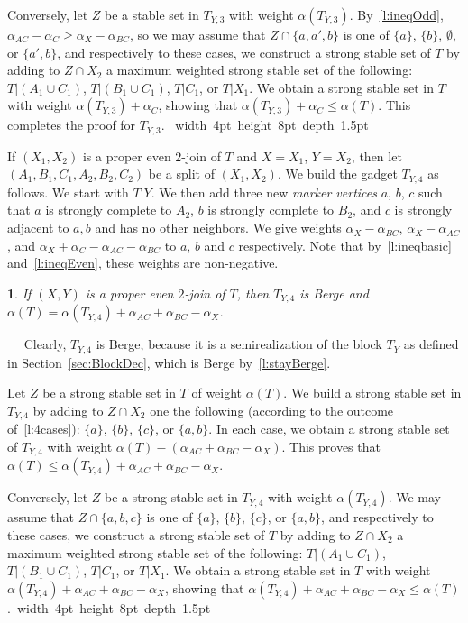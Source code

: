 \documentclass[11 pt] {article}
\newcommand\blackslug{\hbox{\hskip 1pt \vrule width 4pt height 8pt depth 1.5pt
        \hskip 1pt}}
\newcommand\bbox{\hfill \quad \blackslug \medbreak}
\newtheorem{lemma}[theorem]{}
\newcounter{claim}
\newcommand{\Proof}{\setcounter{claim}{0}\noindent{\bf Proof.}\ \ }
\begin{document}
Conversely, let $Z$ be a stable set in $T_{Y, 3}$ with weight
$\alpha(T_{Y, 3})$.  By~\ref{l:ineqOdd}, $\alpha_{AC} - \alpha_C \geq
\alpha_X - \alpha_{BC}$, so we may assume that $Z \cap \{a, a', b\}$
is one of $\{a\}$, $\{b\}$, $\emptyset$, or $\{a', b\}$, and
respectively to these cases, we construct a strong stable set of $T$
by adding to $Z\cap X_2$ a maximum weighted strong stable set of the
following: $T|(A_1 \cup C_1)$, $T|(B_1 \cup C_1)$, $T|C_1$, or
$T|X_1$.  We obtain a strong stable set in $T$ with weight
$\alpha(T_{Y, 3}) + \alpha_C$, showing that $\alpha(T_{Y, 3}) +
\alpha_C \leq \alpha(T)$. This completes the proof for $T_{Y, 3}$.
\bbox


If $(X_1,X_2)$ is a proper even $2$-join of $T$ and $X=X_1$, $Y=X_2$,
then let $(A_1,B_1,C_1,A_2,B_2,C_2)$ be a split of $(X_1, X_2)$. We
build the gadget $T_{Y, 4}$ as follows.  We start with
$T |Y$.  We then add three new \emph{marker vertices} $a$, $b$, $c$
such that $a$ is strongly complete to $A_2$, $b$ is strongly complete
to $B_2$, and $c$ is strongly adjacent to $a, b$ and has no other
neighbors.  We give weights $\alpha_X - \alpha_{BC}$, $\alpha_X -
\alpha_{AC}$, and $\alpha_{X} + \alpha_{C} - \alpha_{AC} -
\alpha_{BC}$ to $a$, $b$ and $c$ respectively.  Note that
by~\ref{l:ineqbasic} and~\ref{l:ineqEven}, these weights are non-negative.

\begin{lemma}
  \label{l:evenblock4}
  If $(X, Y)$ is a proper even $2$-join of $T$, then $T_{Y, 4}$ is
  Berge and $\alpha(T) = \alpha(T_{Y, 4}) + \alpha_{AC} + \alpha_{BC}
  - \alpha_{X}$.
\end{lemma}
\Proof 
Clearly, $T_{Y, 4}$ is Berge, because it is a semirealization of the
block $T_Y$ as defined in Section~\ref{sec:BlockDec}, which is Berge
by~\ref{l:stayBerge}.  

Let $Z$ be a strong stable set in $T$ of weight $\alpha(T)$.
We build a strong stable set in $T_{Y, 4}$ by adding to $Z \cap X_2$
one the following (according to the outcome of~\ref{l:4cases}):
$\{a\}$, $\{b\}$, $\{c\}$, or $\{a, b\}$.  In each case, we obtain a
strong stable set of $T_{Y, 4}$ with weight $\alpha(T) - (\alpha_{AC}
+ \alpha_{BC} - \alpha_{X})$.  This proves that $\alpha(T) \leq
\alpha(T_{Y, 4}) + \alpha_{AC} + \alpha_{BC} - \alpha_{X}$.

Conversely, let $Z$ be a strong stable set in $T_{Y, 4}$ with weight
$\alpha(T_{Y, 4})$.  We may assume that $Z \cap \{a, b, c\}$ is one of
$\{a\}$, $\{b\}$, $\{c\}$, or $\{a, b\}$, and respectively to these
cases, we construct a strong stable set of $T$ by adding to $Z\cap
X_2$ a maximum weighted strong stable set of the following: $T|(A_1
\cup C_1)$, $T|(B_1 \cup C_1)$, $T|C_1$, or $T|X_1$.  We obtain a
strong stable set in $T$ with weight $\alpha(T_{Y, 4}) + \alpha_{AC} +
\alpha_{BC} - \alpha_{X}$, showing that $\alpha(T_{Y, 4}) +
\alpha_{AC} + \alpha_{BC} - \alpha_{X} \leq \alpha(T)$.\bbox
\end{document}
